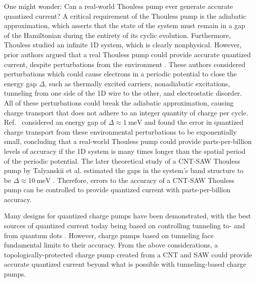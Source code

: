 \documentclass{beavtex_dub_edit}
\begin{document}
One might wonder: Can a real-world Thouless pump ever generate accurate quantized current? A critical requirement of the Thouless pump is the adiabatic approximation, which asserts that the state of the system must remain in a gap of the Hamiltonian during the entirety of its cyclic evolution. Furthermore, Thouless studied an infinite 1D system, which is clearly nonphysical. However, prior authors argued that a real Thouless pump could provide accurate quantized current, despite perturbations from the environment \cite{niu_towards_1990, niu_quantised_1984}. These authors considered perturbations which could cause electrons in a periodic potential to close the energy gap $\Delta$, such as thermally excited carriers, nonadiabatic excitations, tunneling from one side of the 1D wire to the other, and electrostatic disorder. All of these perturbations could break the adiabatic approximation, causing charge transport that does not adhere to an integer quantity of charge per cycle. Ref.\ \cite{niu_towards_1990} considered an energy gap of $\Delta \approx \SI{1}{\milli\electronvolt}$ and found the error in quantized charge transport from these environmental perturbations to be exponentially small, concluding that a real-world Thouless pump could provide parts-per-billion levels of accuracy if the 1D system is many times longer than the spatial period of the periodic potential. The later theoretical study of a CNT-SAW Thouless pump by Talyanskii et al. estimated the gaps in the system's band structure to be $\Delta \approx \SI{10}{\milli\electronvolt}$ \cite{talyanskii_quantized_2001}. Therefore, errors to the accuracy of a CNT-SAW Thouless pump can be controlled to provide quantized current with parts-per-billion accuracy. 

Many designs for quantized charge pumps have been demonstrated, with the best sources of quantized current today being based on controlling tunneling to- and from quantum dots \cite{scherer_singleelectron_2019}. However, charge pumps based on tunneling face fundamental limits to their accuracy. From the above considerations, a topologically-protected charge pump created from a CNT and SAW could provide accurate quantized current beyond what is possible with tunneling-based charge pumps.

\end{document}
